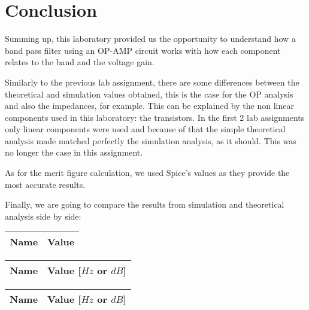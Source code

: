 \section{Conclusion}
\label{sec:conclusion}

Summing up, this laboratory provided us the opportunity to understand how a band pass filter using an OP-AMP circuit works with how each component relates to the band and the voltage gain.\par
Similarly to the previous lab assignment, there are some differences between the theoretical and simulation values obtained, this is the case for the OP analysis and also the impedances, for example. This can be explained by the non linear components used in this laboratory: the transistors. In the first 2 lab assignments only linear components were used and because of that the simple theoretical analysis made matched perfectly the simulation analysis, as it should. This was no longer the case in this assignment. \par
As for the merit figure calculation, we used Spice's values as they provide the most accurate results. \par
Finally, we are going to compare the results from simulation and theoretical analysis side by side: \par

\begin{center}
  \begin{tabular}{ | c | c | }
    \hline    
    {\bf Name} & {\bf Value} \\ \hline
    
  \end{tabular}
\end{center}

\begin{center}
  \begin{tabular}{ | c | c | }
    \hline    
    {\bf Name} & {\bf Value [$Hz$ or $dB$]} \\ \hline
    
    \hline
  \end{tabular}
\end{center}

\begin{center}
  \begin{tabular}{ | c | c | }
    \hline    
    {\bf Name} & {\bf Value [$Hz$ or $dB$]} \\ \hline
    
    \hline
  \end{tabular}
\end{center}

